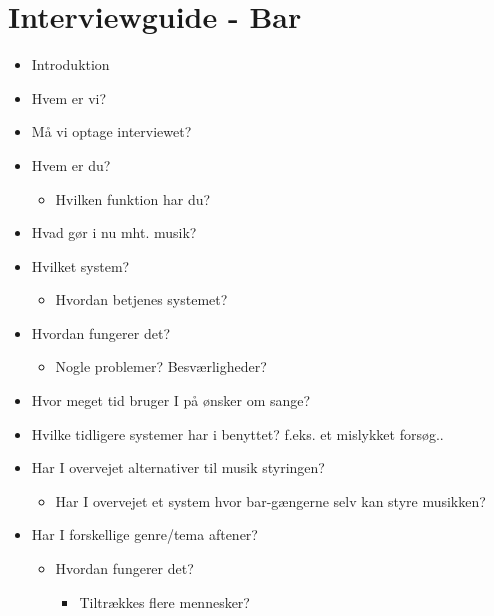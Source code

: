 \chapter{Interviewguide - Bar}
\label{app:interview_guide}
\begin{itemize}
\itemsep1pt\parskip0pt
\item
  Introduktion
\item
  Hvem er vi?
\item
  Må vi optage interviewet?
\item
  Hvem er du?

  \begin{itemize}
  \itemsep1pt\parskip0pt
  \item
    Hvilken funktion har du?
  \end{itemize}
\item
  Hvad gør i nu mht. musik?
\item
  Hvilket system?

  \begin{itemize}
  \itemsep1pt\parskip0pt
  \item
    Hvordan betjenes systemet?
  \end{itemize}
\item
  Hvordan fungerer det?

  \begin{itemize}
  \itemsep1pt\parskip0pt
  \item
    Nogle problemer? Besværligheder?
  \end{itemize}
\item
  Hvor meget tid bruger I på ønsker om sange?
\item
  Hvilke tidligere systemer har i benyttet? f.eks. et mislykket forsøg..
\item
  Har I overvejet alternativer til musik styringen?

  \begin{itemize}
  \itemsep1pt\parskip0pt
  \item
    Har I overvejet et system hvor bar-gængerne selv kan styre musikken?
  \end{itemize}
\item
  Har I forskellige genre/tema aftener?

  \begin{itemize}
  \itemsep1pt\parskip0pt
  \item
    Hvordan fungerer det?

    \begin{itemize}
    \itemsep1pt\parskip0pt
    \item
      Tiltrækkes flere mennesker?
    \end{itemize}
  \end{itemize}
\end{itemize}
